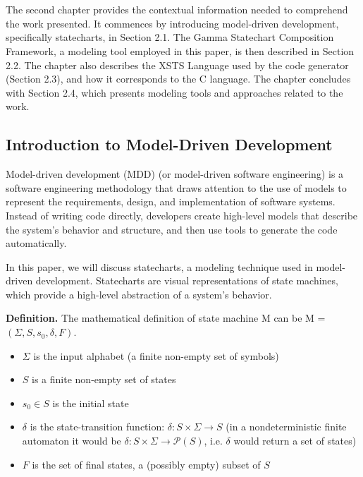 
\chapter{\hatter}

The second chapter provides the contextual information needed to comprehend the work presented. It commences by introducing model-driven development, specifically statecharts, in Section 2.1. The Gamma Statechart Composition Framework, a modeling tool employed in this paper, is then described in Section 2.2. The chapter also describes the XSTS Language used by the code generator (Section 2.3), and how it corresponds to the C language. The chapter concludes with Section 2.4, which presents modeling tools and approaches related to the work.

\section{Introduction to Model-Driven Development}

Model-driven development (MDD) (or model-driven software engineering) is a software engineering methodology that draws attention to the use of models to represent the requirements, design, and implementation of software systems. Instead of writing code directly, developers create high-level models that describe the system's behavior and structure, and then use tools to generate the code automatically.

In this paper, we will discuss statecharts, a modeling technique used in model-driven development. Statecharts are visual representations of state machines, which provide a high-level abstraction of a system's behavior.

\textbf{Definition.} The mathematical definition of state machine M can be M = $(\Sigma, S, s_0, \delta, F)$.

\begin{itemize}
	\item $\Sigma$ is the input alphabet (a finite non-empty set of symbols)
	\item $S$ is a finite non-empty set of states
	\item $s_0 \in S$ is the initial state
	\item $\delta$ is the state-transition function: $\delta:S \times \Sigma \rightarrow S$ (in a nondeterministic finite automaton it would be $\delta:S \times \Sigma \rightarrow \mathcal{P}(S)$, i.e. $\delta$ would return a set of states)
	\item $F$ is the set of final states, a (possibly empty) subset of $S$
\end{itemize}

